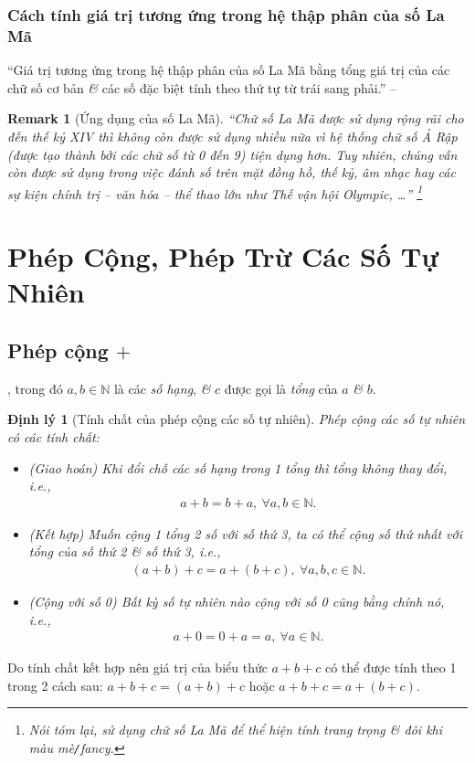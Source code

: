 \documentclass[oneside]{book}
\numberwithin{equation}{section}
\newtheorem{remark}{Remark}[section]
\newtheorem{dinhly}{Định lý}[section]
\begin{document}
\subsubsection{Cách tính giá trị tương ứng trong hệ thập phân của số La Mã}
``Giá trị tương ứng trong hệ thập phân của số La Mã bằng tổng giá trị của các chữ số cơ bản \textit{\&} các số đặc biệt tính theo thứ tự từ trái sang phải.'' -- \cite[p. 14]{Thai_Anh_Dat_Ha_Loan_Nam_Quang_Toan_6_tap_1}

\begin{remark}[Ứng dụng của số La Mã]
	``Chữ số La Mã được sử dụng rộng rãi cho đến thế kỷ XIV thì không còn được sử dụng nhiều nữa vì hệ thống chữ số Ả Rập (được tạo thành bởi các chữ số từ 0 đến 9) tiện dụng hơn. Tuy nhiên, chúng vẫn còn được sử dụng trong việc đánh số trên mặt đồng hồ, thế kỷ, âm nhạc hay các sự kiện chính trị -- văn hóa -- thể thao lớn như Thế vận hội Olympic, \ldots'' \footnote{Nói tóm lại, sử dụng chữ số La Mã để thể hiện tính trang trọng \textit{\&} đôi khi màu mè\texttt{/}fancy.}
\end{remark}

\section{Phép Cộng, Phép Trừ Các Số Tự Nhiên}

\subsection{Phép cộng $+$}
, trong đó $a,b\in\mathbb{N}$ là các \textit{số hạng}, \textit{\&} $c$ được gọi là \textit{tổng} của $a$ \textit{\&} $b$.

\begin{dinhly}[Tính chất của phép cộng các số tự nhiên]
	Phép cộng các số tự nhiên có các tính chất:
	\begin{itemize}
		\item (Giao hoán) Khi đổi chỗ các số hạng trong 1 tổng thì tổng không thay đổi, i.e.,
		\begin{align*}
			a + b = b + a,\ \forall a,b\in\mathbb{N}.
		\end{align*}
		\item (Kết hợp) Muốn cộng 1 tổng 2 số với số thứ 3, ta có thể cộng số thứ nhất với tổng của số thứ 2 \textit{\&} số thứ 3, i.e.,
		\begin{align*}
			(a + b) + c = a +(b + c),\ \forall a,b,c\in\mathbb{N}.
		\end{align*}
		\item (Cộng với số 0) Bất kỳ số tự nhiên nào cộng với số 0 cũng bằng chính nó, i.e.,
		\begin{align*}
			a + 0 = 0 + a = a,\ \forall a\in\mathbb{N}.
		\end{align*}
	\end{itemize}
\end{dinhly}
Do tính chất kết hợp nên giá trị của biểu thức $a + b + c$ có thể được tính theo 1 trong 2 cách sau: $a + b + c = (a + b) + c$ hoặc $a + b + c = a + (b + c)$.
\end{document}
